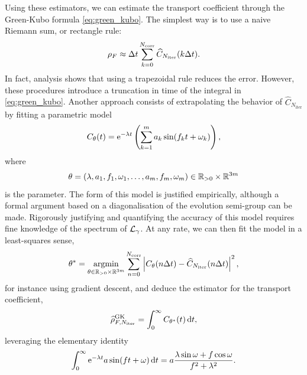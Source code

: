 Using these estimators, we can estimate the transport coefficient through the Green-Kubo formula \eqref{eq:green_kubo}. The simplest way is to use a naive Riemann sum, or rectangle rule:
\[\rho_F \approx {\Delta t}\sum_{k=0}^{N_{\mathrm{corr}}} \widehat{C}_{N_{\mathrm{iter}}}(k{\Delta t}).\]
In fact, analysis shows that using a trapezoidal rule reduces the error.
However, these procedures introduce a truncation in time of the integral in \eqref{eq:green_kubo}.
Another approach consists of extrapolating the behavior of $\widehat{C}_{N_{\mathrm{iter}}}$ by fitting a parametric model 
\begin{equation}
    \label{eq:time_correlation_parametric_model}
    C_{\theta}(t)=\mathrm{e}^{-\lambda t}\left(\sum_{k=1}^{m}a_k\sin(f_k t+\omega_k)\right),
\end{equation}
where \[\theta=(\lambda,a_1,f_1,\omega_1,\dots,a_m,f_m,\omega_m)\in \mathbb{R}_{>0}\times\mathbb{R}^{3m}\]
is the parameter. The form of this model is justified empirically, although a formal argument based on a diagonalisation of the evolution semi-group can be made. 
Rigorously justifying and quantifying the accuracy of this model requires fine knowledge of the spectrum of $\mathcal{L}_\gamma$.
At any rate, we can then fit the model in a least-squares sense,
\begin{equation}
    \theta^*=\underset{\theta\in \mathbb{R}_{>0}\times\mathbb{R}^{3m}}{\mathrm{argmin}}\sum_{n=0}^{N_{\mathrm{corr}}}\left| C_{\theta}(n{\Delta t})-\widehat{C}_{N_{\mathrm{iter}}}(n{\Delta t}) \right|^2,
\end{equation}
for instance using gradient descent, and deduce the estimator for the transport coefficient,
\begin{equation}
    \label{eq:rho_F_estimator_GK_fit}
    \widehat{\rho}^{\mathrm{GK}}_{F,N_{\mathrm{iter}}}=\int_0^\infty C_{\theta^*}(t)\,\mathrm{d} t,
\end{equation}
leveraging the elementary identity
\begin{equation}
    \label{eq:int_analytic_form}
    \int_0^{\infty}\mathrm{e}^{-\lambda t}a\sin(ft+\omega)\,\mathrm{d} t=a\frac{\lambda\sin\omega+f\cos\omega}{f^2+\lambda^2}.
\end{equation}
